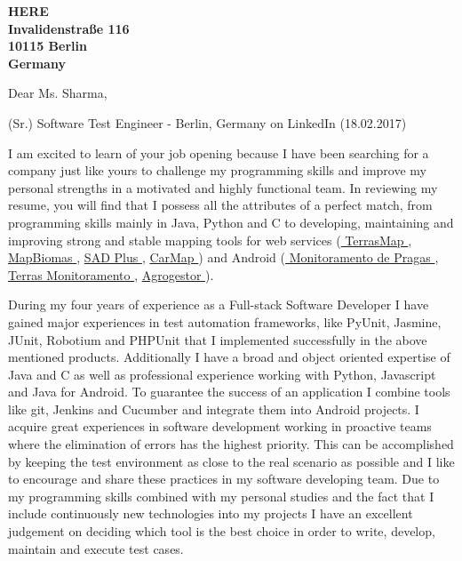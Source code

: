 \documentclass[a4paper]{joaosoares-letter}
\begin{document}
\longindentation=0pt


\begin{letter}{\bfseries HERE\\Invalidenstraße 116\\10115 Berlin\\Germany}


\date{Belém, \today}


\opening{Dear Ms. Sharma,}{(Sr.) Software Test Engineer - Berlin, Germany on LinkedIn (18.02.2017)}

I am excited to learn of your job opening because I have been searching for a company just like yours to challenge my programming skills and improve my personal strengths in a motivated and highly functional team. In reviewing my resume, you will find that I possess all the attributes of a perfect match, from programming skills mainly in Java, Python and C to developing, maintaining and improving strong and stable mapping tools for web services (\href{https://goo.gl/6gUzPA}{ TerrasMap }, \href{https://goo.gl/eYX5SW}{ MapBiomas }, \href{https://goo.gl/2J41hR}{ SAD Plus }, \href{https://goo.gl/fCCp9s}{ CarMap }) and Android (\href{https://goo.gl/RcdbHk}{ Monitoramento de Pragas }, \href{https://goo.gl/OyZXke}{ Terras Monitoramento }, \href{https://goo.gl/mycBmL}{ Agrogestor }).

During my four years of experience as a Full-stack Software Developer I have gained major experiences in test automation frameworks, like PyUnit, Jasmine, JUnit, Robotium and PHPUnit that I implemented successfully in the above mentioned products. Additionally I have a broad and object oriented expertise of Java and C as well as professional experience working with Python, Javascript and Java for Android. To guarantee the success of an application I combine tools like git, Jenkins and Cucumber and integrate them into Android projects. I acquire great experiences in software development working in proactive teams where the elimination of errors has the highest priority. This can be accomplished by keeping the test environment as close to the real scenario as possible and I like to encourage and share these practices in my software developing team. Due to my programming skills combined with my personal studies and the fact that I include continuously new technologies into my projects I have an excellent judgement on deciding which tool is the best choice in order to write, develop, maintain and execute test cases.


\end{letter}
\end{document}
